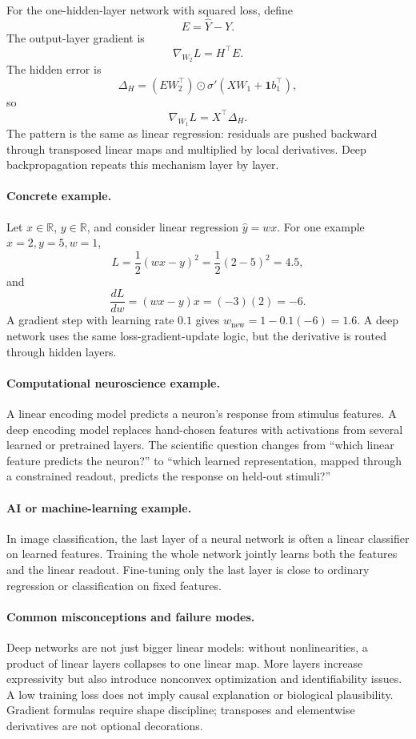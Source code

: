 For the one-hidden-layer network with squared loss, define
\[
E=\widehat Y-Y.
\]
The output-layer gradient is
\[
\nabla_{W_2}L=H^\top E.
\]
The hidden error is
\[
\Delta_H=(EW_2^\top)\odot \sigma'(XW_1+\mathbf 1 b_1^\top),
\]
so
\[
\nabla_{W_1}L=X^\top \Delta_H.
\]
The pattern is the same as linear regression: residuals are pushed backward through transposed linear maps and multiplied by local derivatives. Deep backpropagation repeats this mechanism layer by layer.

\paragraph{Concrete example.}
Let \(x\in\mathbb R\), \(y\in\mathbb R\), and consider linear regression \(\widehat y=wx\). For one example \(x=2,y=5,w=1\),
\[
L=\frac12(wx-y)^2=\frac12(2-5)^2=4.5,
\]
and
\[
\frac{dL}{dw}=(wx-y)x=(-3)(2)=-6.
\]
A gradient step with learning rate \(0.1\) gives \(w_{\mathrm{new}}=1-0.1(-6)=1.6\). A deep network uses the same loss-gradient-update logic, but the derivative is routed through hidden layers.

\paragraph{Computational neuroscience example.}
A linear encoding model predicts a neuron's response from stimulus features. A deep encoding model replaces hand-chosen features with activations from several learned or pretrained layers. The scientific question changes from ``which linear feature predicts the neuron?'' to ``which learned representation, mapped through a constrained readout, predicts the response on held-out stimuli?''

\paragraph{AI or machine-learning example.}
In image classification, the last layer of a neural network is often a linear classifier on learned features. Training the whole network jointly learns both the features and the linear readout. Fine-tuning only the last layer is close to ordinary regression or classification on fixed features.

\paragraph{Common misconceptions and failure modes.}
Deep networks are not just bigger linear models: without nonlinearities, a product of linear layers collapses to one linear map. More layers increase expressivity but also introduce nonconvex optimization and identifiability issues. A low training loss does not imply causal explanation or biological plausibility. Gradient formulas require shape discipline; transposes and elementwise derivatives are not optional decorations.

